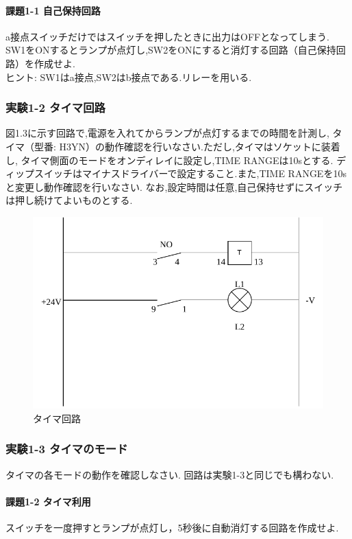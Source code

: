 \paragraph{課題1-1 自己保持回路}
a接点スイッチだけではスイッチを押したときに出力はOFFとなってしまう.
SW1をONするとランプが点灯し,SW2をONにすると消灯する回路（自己保持回路）を作成せよ.\\
ヒント: SW1はa接点,SW2はb接点である.リレーを用いる.

\subsubsection{実験1-2 タイマ回路}
図1.3に示す回路で,電源を入れてからランプが点灯するまでの時間を計測し,
タイマ（型番: H3YN）の動作確認を行いなさい.ただし,タイマはソケットに装着し,
タイマ側面のモードをオンディレイに設定し,TIME RANGEは10sとする.
ディップスイッチはマイナスドライバーで設定すること.また,TIME RANGEを10sと変更し動作確認を行いなさい.
なお,設定時間は任意,自己保持せずにスイッチは押し続けてよいものとする.

\begin{figure}[H]
  \centering
  \includegraphics[scale=0.5]{sozai/2.pdf}
  \caption{タイマ回路}
\end{figure}

\subsubsection{実験1-3 タイマのモード}
タイマの各モードの動作を確認しなさい.
回路は実験1-3と同じでも構わない.

\paragraph{課題1-2 タイマ利用}
スイッチを一度押すとランプが点灯し，5秒後に自動消灯する回路を作成せよ.

